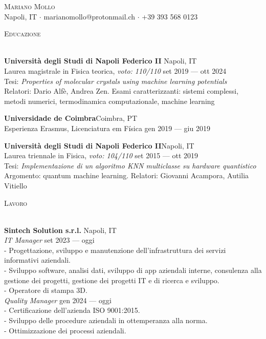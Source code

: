 \documentclass[a4paper]{article}
\newcommand{\lineunder} {
  \vspace*{-8pt} \\
  \hspace*{-18pt} \hrulefill \\
}
\newcommand{\header} [1] {
  {\hspace*{-18pt}\vspace*{6pt} \textsc{#1}}
  \vspace*{-6pt} \lineunder
}
\begin{document}
\vspace*{-40pt}

    

\vspace*{-10pt}
\begin{center}
  {\Huge \scshape {Mariano Mollo}}\\
  Napoli, IT $\cdot$ marianomollo@protonmail.ch $\cdot$ +39 393 568 0123\\
\end{center}

\header{Educazione}
\vspace{1mm}

\textbf{Università degli Studi di Napoli Federico II} \hfill Napoli, IT \\
Laurea magistrale in Fisica teorica, \textit{voto: 110/110} \hfill set 2019 --- ott 2024 \\
Tesi: \textit{Properties of molecular crystals using machine learning potentials} \\
Relatori: Dario Alfè, Andrea Zen.
Esami caratterizzanti: sistemi complessi, metodi numerici, termodinamica computazionale, machine learning

\vspace{2mm}

\textbf{Universidade de Coimbra}\hfill Coimbra, PT\\
Esperienza Erasmus, Licenciatura em Física \hfill gen 2019 --- giu 2019

\vspace{2mm}

\textbf{Università degli Studi di Napoli Federico II}\hfill Napoli, IT\\
Laurea triennale in Fisica, \textit{voto: 104/110} \hfill set 2015 --- ott 2019\\
Tesi: \textit{Implementazione di un algoritmo KNN multiclasse su hardware quantistico}\\
Argomento: quantum machine learning.
Relatori: Giovanni Acampora, Autilia Vitiello

\vspace{2mm}

\header{Lavoro}
\vspace{1mm}

\textbf{Sintech Solution s.r.l.} \hfill Napoli, IT \\
\textit{IT Manager} \hfill set 2023 --- oggi \\
- Progettazione, sviluppo e manutenzione dell'infrastruttura dei servizi informativi aziendali. \\
- Sviluppo software, analisi dati, sviluppo di app aziendali interne, consulenza alla gestione dei progetti, gestione dei progetti IT e di ricerca e sviluppo. \\
- Operatore di stampa 3D. \\
\textit{Quality Manager} \hfill gen 2024 --- oggi \\
- Certificazione dell'azienda ISO 9001:2015. \\
- Sviluppo delle procedure aziendali in ottemperanza alla norma. \\
- Ottimizzazione dei processi aziendali.
\end{document}
